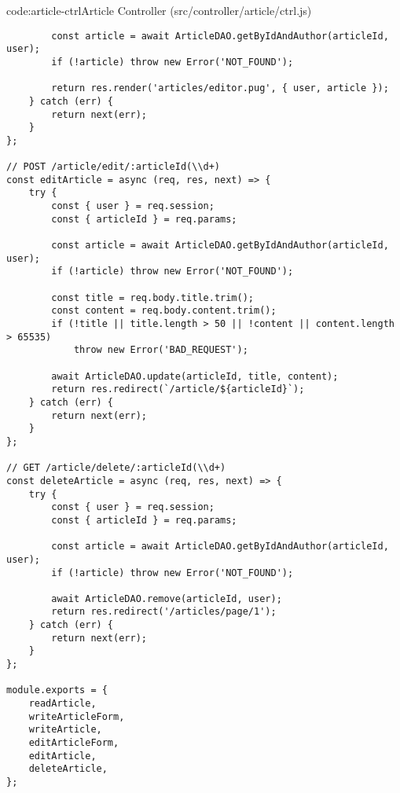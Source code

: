 \begin{code}{code:article-ctrl}{Article Controller (src/controller/article/ctrl.js)}
\begin{verbatim}
        const article = await ArticleDAO.getByIdAndAuthor(articleId, user);
        if (!article) throw new Error('NOT_FOUND');

        return res.render('articles/editor.pug', { user, article });
    } catch (err) {
        return next(err);
    }
};

// POST /article/edit/:articleId(\\d+)
const editArticle = async (req, res, next) => {
    try {
        const { user } = req.session;
        const { articleId } = req.params;

        const article = await ArticleDAO.getByIdAndAuthor(articleId, user);
        if (!article) throw new Error('NOT_FOUND');

        const title = req.body.title.trim();
        const content = req.body.content.trim();
        if (!title || title.length > 50 || !content || content.length > 65535)
            throw new Error('BAD_REQUEST');

        await ArticleDAO.update(articleId, title, content);
        return res.redirect(`/article/${articleId}`);
    } catch (err) {
        return next(err);
    }
};

// GET /article/delete/:articleId(\\d+)
const deleteArticle = async (req, res, next) => {
    try {
        const { user } = req.session;
        const { articleId } = req.params;

        const article = await ArticleDAO.getByIdAndAuthor(articleId, user);
        if (!article) throw new Error('NOT_FOUND');

        await ArticleDAO.remove(articleId, user);
        return res.redirect('/articles/page/1');
    } catch (err) {
        return next(err);
    }
};

module.exports = {
    readArticle,
    writeArticleForm,
    writeArticle,
    editArticleForm,
    editArticle,
    deleteArticle,
};
\end{verbatim}
\end{code}

